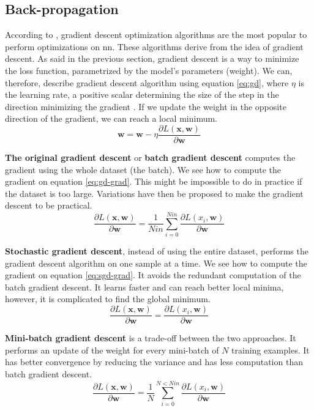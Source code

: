 \subsection{Back-propagation} \label{subs:trainbackward}
According to \textcite{ruder_overview_2017}, gradient descent optimization algorithms are the most popular to perform optimizations on \acrshort{nn}. These algorithms derive from the idea of gradient descent. As said in the previous section, gradient descent is a way to minimize the loss function, parametrized by the model's parameters (weight). We can, therefore, describe gradient descent algorithm using equation \eqref{eq:gd}, where $\eta$ is the learning rate, a positive scalar determining the size of the step in the direction minimizing the gradient \cite{goodfellow_deep_2016}. If we update the weight in the opposite direction of the gradient, we can reach a local minimum.
%
\begin{equation}
    \boldsymbol{w} = \boldsymbol{w} - \eta \frac{ \partial L( \boldsymbol{x}, \boldsymbol{w} ) }{\partial \boldsymbol{w}}
    \label{eq:gd}
\end{equation}

\textbf{The original gradient descent} or \textbf{batch gradient descent }computes the gradient using the whole dataset (the batch). We see how to compute the gradient on equation \eqref{eq:gd-grad}. This might be impossible to do in practice if the dataset is too large. Variations have then be proposed to make the gradient descent to be practical.
%
\begin{equation}
    \frac{ \partial L( \boldsymbol{x}, \boldsymbol{w} ) }{\partial \boldsymbol{w}} = \frac{1}{Nin} \sum^{Nin}_{i = 0} \frac{ \partial L( x_i, \boldsymbol{w} ) }{\partial \boldsymbol{w}}
    \label{eq:gd-grad}
\end{equation}

\textbf{Stochastic gradient descent}, instead of using the entire dataset, performs the gradient descent algorithm on one sample at a time. We see how to compute the gradient on equation \eqref{eq:sgd-grad}. It avoids the redundant computation of the batch gradient descent. It learns faster and can reach better local minima, however, it is complicated to find the global minimum.
%
\begin{equation}
    \frac{ \partial L( \boldsymbol{x}, \boldsymbol{w} ) }{\partial \boldsymbol{w}} = \frac{ \partial L( x_i, \boldsymbol{w} ) }{\partial \boldsymbol{w}}
    \label{eq:sgd-grad}
\end{equation}

\textbf{Mini-batch gradient descent} is a trade-off between the two approaches. It performs an update of the weight for every mini-batch of $N$ training examples. It has better convergence  by reducing the variance and has less computation than batch gradient descent.
%
\begin{equation}
    \frac{ \partial L( \boldsymbol{x}, \boldsymbol{w} ) }{\partial \boldsymbol{w}} = \frac{1}{N} \sum^{N < Nin}_{i = 0} \frac{ \partial L( x_i, \boldsymbol{w} ) }{\partial \boldsymbol{w}}
    \label{eq:bgd-grad}
\end{equation}
